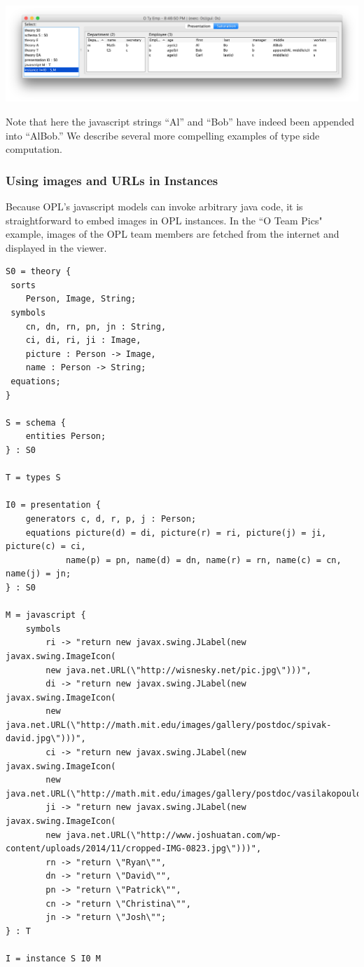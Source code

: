 \documentclass[12pt]{article}
\begin{document}
\begin{center}
\includegraphics[width=6in]{instance2}
\end{center}

Note that here the javascript strings ``Al'' and ``Bob'' have indeed been appended into ``AlBob.''  We describe several more compelling examples of type side computation.

\subsubsection{Using images and URLs in Instances}

Because OPL's javascript models can invoke arbitrary java code, it is straightforward to embed images in OPL instances.  In the ``O Team Pics" example, images of the OPL team members are fetched from the internet and displayed in the viewer.

\begin{verbatim}
S0 = theory { 
 sorts
 	Person, Image, String;
 symbols
 	cn, dn, rn, pn, jn : String,
 	ci, di, ri, ji : Image,
 	picture : Person -> Image,
 	name : Person -> String;
 equations;
}

S = schema {
	entities Person;	
} : S0

T = types S

I0 = presentation {
	generators c, d, r, p, j : Person;
	equations picture(d) = di, picture(r) = ri, picture(j) = ji, picture(c) = ci,
			name(p) = pn, name(d) = dn, name(r) = rn, name(c) = cn, name(j) = jn;
} : S0

M = javascript {
	symbols
		ri -> "return new javax.swing.JLabel(new javax.swing.ImageIcon(
		new java.net.URL(\"http://wisnesky.net/pic.jpg\")))",						
		di -> "return new javax.swing.JLabel(new javax.swing.ImageIcon(
		new java.net.URL(\"http://math.mit.edu/images/gallery/postdoc/spivak-david.jpg\")))",
		ci -> "return new javax.swing.JLabel(new javax.swing.ImageIcon(
		new java.net.URL(\"http://math.mit.edu/images/gallery/postdoc/vasilakopoulou.png\")))",
		ji -> "return new javax.swing.JLabel(new javax.swing.ImageIcon(
		new java.net.URL(\"http://www.joshuatan.com/wp-content/uploads/2014/11/cropped-IMG-0823.jpg\")))",
		rn -> "return \"Ryan\"",
		dn -> "return \"David\"",
		pn -> "return \"Patrick\"",
		cn -> "return \"Christina\"",
		jn -> "return \"Josh\"";			
} : T

I = instance S I0 M
\end{verbatim}
\end{document}
